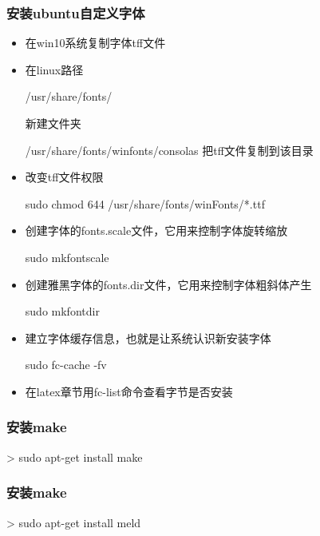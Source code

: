 \subsubsection{安装ubuntu自定义字体}
\begin{itemize}
\item 在win10系统复制字体tff文件

\item  在linux路径
\begin{messagebox}
/usr/share/fonts/
\end{messagebox}
新建文件夹
\begin{messagebox}
/usr/share/fonts/winfonts/consolas
把tff文件复制到该目录
\end{messagebox}

\item 改变tff文件权限
\begin{commandbox}
sudo chmod 644 /usr/share/fonts/winFonts/*.ttf
\end{commandbox}

\item 创建字体的fonts.scale文件，它用来控制字体旋转缩放
\begin{commandbox}
sudo mkfontscale
\end{commandbox}

\item 创建雅黑字体的fonts.dir文件，它用来控制字体粗斜体产生
\begin{commandbox}
sudo mkfontdir
\end{commandbox}

\item 建立字体缓存信息，也就是让系统认识新安装字体
\begin{commandbox}
sudo fc-cache -fv
\end{commandbox}

\item 在latex章节用fc-list命令查看字节是否安装

\end{itemize}

\subsubsection{安装make}
\begin{commandbox}
 > sudo apt-get install make
\end{commandbox}

\subsubsection{安装make}
\begin{commandbox}
 > sudo apt-get install meld
\end{commandbox}
